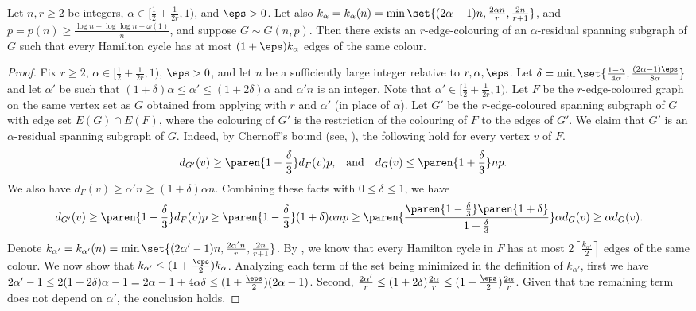 \documentclass[10pt,a4paper,reqno]{amsart}
\begin{document}
\begin{proposition}
  Let $n,r \geq 2$ be integers, $\alpha \in [\frac{1}{2} + \frac{1}{2r}, 1)$,
  and $\eps > 0$.  Let also $k_{\alpha} = k_{\alpha}(n) = \min\set{(2\alpha - 1)n, \frac{2\alpha n}{r}, \frac{2n}{r + 1}}$,
  and $p = p(n) \geq \frac{\log{n} + \log\log{n} + \omega(1)}{n}$, and suppose $G \sim G(n, p)$. Then \whp there exists an $r$-edge-colouring of an $\alpha$-residual spanning subgraph of $G$ such that every Hamilton cycle has at most $(1 + \eps)k_{\alpha}$ edges of the same colour. 
\end{proposition}
\begin{proof}
Fix $r \geq 2$, $\alpha \in [\frac{1}{2} + \frac{1}{2r}, 1)$, $\eps > 0$, and let $n$ be a sufficiently large integer relative to $r,\alpha,\eps$. Let $\delta = \min\set{\frac{1-\alpha}{4\alpha}, \frac{(2\alpha - 1)\eps}{8\alpha}}$ and let $\alpha'$ be such that $(1 + \delta)\alpha \le \alpha' \le (1 + 2\delta)\alpha$ and $\alpha' n$ is an integer. Note that $\alpha'\in [\frac{1}{2} + \frac{1}{2r}, 1)$. Let $F$ be the $r$-edge-coloured graph on the same vertex set as $G$ obtained from applying  with $r$ and $\alpha'$ (in place of $\alpha$). Let $G'$ be the $r$-edge-coloured spanning subgraph of $G$ with edge set $E(G) \cap E(F)$, where the colouring of $G'$ is the restriction of the colouring of $F$ to the edges of $G'$. We claim that \whp $G'$ is an $\alpha$-residual spanning subgraph of $G$. Indeed, by Chernoff's bound (see, ), \whp the following hold for every vertex $v$ of $F$. 
\begin{align*}
    d_{G'}(v) &\geq \paren{1 - \frac{\delta}{3}} d_F(v) p, & &\text{and} & d_G(v) &\leq \paren{1 + \frac{\delta}{3}} np.
\end{align*}
We also have $d_F(v) \geq \alpha' n \geq (1 + \delta)\alpha n$. Combining these facts with $0\le \delta\le 1$, we have
\begin{equation*}
    d_{G'}(v) \geq \paren{1 - \frac{\delta}{3}} d_F(v) p \geq \paren{1 - \frac{\delta}{3}} (1 + \delta)\alpha
    n p \geq \paren{\frac{\paren{1 - \frac{\delta}{3}}\paren{1 + \delta}}{1 + \frac{\delta}{3}}} \alpha d_G(v) \geq \alpha d_G(v).
\end{equation*}
Denote $k_{\alpha'} = k_{\alpha'}(n) = \min\set{(2\alpha' - 1)n, \frac{2\alpha' n}{r}, \frac{2n}{r + 1}}$. By , we know that every Hamilton cycle in $F$ has at most $2\left\lceil\frac{k_{\alpha'}}{2}\right\rceil$ edges of the same colour. We now show that $k_{\alpha'} \leq (1 + \frac{\eps}{2})k_{\alpha}$. Analyzing each term of the set being minimized in the definition of $k_{\alpha'}$, first we have $2\alpha' - 1 \leq 2(1 + 2\delta)\alpha - 1 = 2\alpha - 1 + 4\alpha\delta \le (1 + \frac{\eps}{2})(2\alpha - 1)$. Second, $\frac{2\alpha'}{r} \leq (1 + 2\delta) \frac{2\alpha}{r} \leq (1 + \frac{\eps}{2}) \frac{2\alpha}{r}$. Given that the remaining term does not depend on $\alpha'$, the conclusion holds.


\end{proof}
\end{document}
